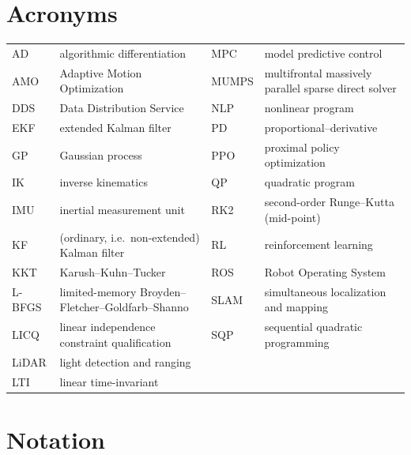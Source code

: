 \documentclass[11pt,a4paper]{article}
\begin{document}


\newpage
\tableofcontents
\vspace{10pt}

\newpage
\section*{Acronyms}

\noindent\begin{tabularx}{\textwidth}{@{}lX@{\hspace{1.2em}}lX@{}}
AD    & algorithmic differentiation      & MPC   & model predictive control \\
AMO   & Adaptive Motion Optimization     & MUMPS & multifrontal massively parallel sparse direct solver \\
DDS   & Data Distribution Service        & NLP   & nonlinear program \\
EKF   & extended Kalman filter           & PD    & proportional--derivative \\
GP    & Gaussian process                 & PPO   & proximal policy optimization \\
IK    & inverse kinematics               & QP    & quadratic program \\
IMU   & inertial measurement unit        & RK2   & second-order Runge--Kutta (mid-point) \\
KF    & (ordinary, i.e.\ non-extended) Kalman filter & RL    & reinforcement learning \\
KKT   & Karush--Kuhn--Tucker             & ROS   & Robot Operating System \\
L-BFGS & limited-memory Broyden--\allowbreak Fletcher--\allowbreak Goldfarb--\allowbreak Shanno & SLAM & simultaneous localization and mapping \\
LICQ  & linear independence constraint qualification & SQP & sequential quadratic programming \\
LiDAR & light detection and ranging      &       & \\
LTI   & linear time-invariant            &       & \\
\end{tabularx}

\section*{Notation}
\end{document}
